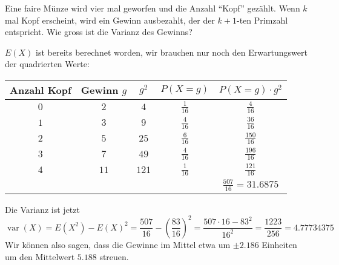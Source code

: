 Eine faire Münze wird vier mal geworfen und die Anzahl ``Kopf'' gezählt.
Wenn $k$ mal Kopf erscheint, wird ein Gewinn ausbezahlt, der der $k+1$-ten
Primzahl entspricht. Wie gross ist die Varianz des Gewinns?


\begin{loesung}
$E(X)$ ist bereits berechnet worden, wir brauchen nur noch den
Erwartungswert der quadrierten Werte:
\begin{center}
\begin{tabular}{|c|c|c|c|c|}
\hline
Anzahl Kopf&Gewinn $g$&$g^2$&$P(X=g)$&$P(X=g)\cdot g^2$\\
\hline
$0$&$ 2$&$  4$&$\frac1{16}$&$\frac{  4}{16}$\\
$1$&$ 3$&$  9$&$\frac4{16}$&$\frac{ 36}{16}$\\
$2$&$ 5$&$ 25$&$\frac6{16}$&$\frac{150}{16}$\\
$3$&$ 7$&$ 49$&$\frac4{16}$&$\frac{196}{16}$\\
$4$&$11$&$121$&$\frac1{16}$&$\frac{121}{16}$\\
\hline
&&&&$\frac{507}{16}=31.6875$\\
\hline
\end{tabular}
\end{center}
Die Varianz ist jetzt
\[
\operatorname{var}(X)
=E(X^2)-E(X)^2
=\frac{507}{16}-\left(\frac{83}{16}\right)^2
=\frac{507\cdot 16 - 83^2}{16^2}=\frac{1223}{256}=4.77734375
\]
Wir können also sagen, dass die Gewinne im Mittel
etwa um $\pm2.186$ Einheiten um den Mittelwert $5.188$
streuen.
\end{loesung}

